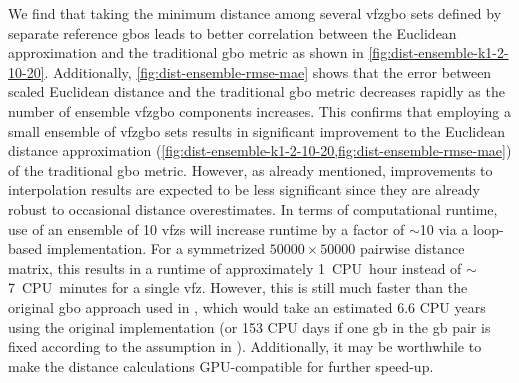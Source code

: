 \documentclass[final,twocolumn,12pt]{elsarticle}
\begin{document}
We find that taking the minimum distance among several \gls{vfzgbo} sets defined by separate reference \glspl{gbo} leads to better correlation between the Euclidean approximation and the traditional \gls{gbo} metric as shown in \cref{fig:dist-ensemble-k1-2-10-20}. Additionally, \cref{fig:dist-ensemble-rmse-mae} shows that the error between scaled Euclidean distance and the traditional \gls{gbo} metric decreases rapidly as the number of ensemble \gls{vfzgbo} components increases. This confirms that employing a small ensemble of \gls{vfzgbo} sets results in significant improvement to the Euclidean distance approximation (\cref{fig:dist-ensemble-k1-2-10-20,fig:dist-ensemble-rmse-mae}) of the traditional \gls{gbo} metric. However, as already mentioned, improvements to interpolation results are expected to be less significant since they are already robust to occasional distance overestimates. In terms of computational runtime, use of an ensemble of 10 \glspl{vfz} will increase runtime by a factor of $\sim$10 via a loop-based implementation. For a symmetrized $\num{50000}\times\num{50000}$ pairwise distance matrix, this results in a runtime of approximately 1~CPU~hour instead of $\sim$7~CPU~minutes for a single \gls{vfz}. However, this is still much faster than the original \gls{gbo} approach used in \cite{chesserLearningGrainBoundary2020}, which would take an estimated 6.6 CPU years using the original implementation (or 153 CPU days if one \gls{gb} in the \gls{gb} pair is fixed according to the assumption in \citet{morawiecDistancesGrainInterfaces2019}). Additionally, it may be worthwhile to make the distance calculations GPU-compatible for further speed-up. %
\end{document}
